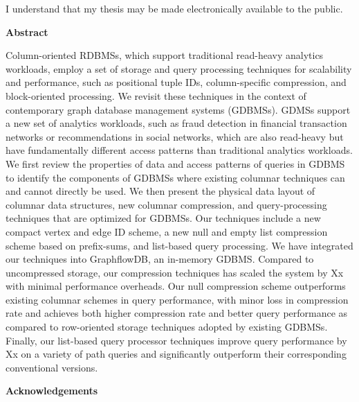 \bigskip
  
\noindent
I understand that my thesis may be made electronically available to the public.

\cleardoublepage


\begin{center}\textbf{Abstract}\end{center}

Column-oriented RDBMSs, which support traditional read-heavy analytics workloads, employ a set of storage and query processing techniques for scalability and performance, such as positional tuple IDs, column-specific compression, and block-oriented processing. We revisit these techniques in the context of contemporary graph database management systems (GDBMSs). GDMSs support a new set of analytics workloads, such as fraud detection in financial transaction networks or recommendations in social networks, which are also read-heavy but have fundamentally different access patterns than traditional analytics workloads. We first review the properties of data and access patterns of queries in GDBMS to identify the components of GDBMSs where existing columnar techniques can and cannot directly be used. We then present the physical data layout of columnar data structures, new columnar compression, and query-processing techniques that are optimized for GDBMSs. Our techniques include a new compact vertex and edge ID scheme, a new null and empty list compression scheme based on prefix-sums, and list-based query processing. We have integrated our techniques into GraphflowDB, an in-memory GDBMS. Compared to uncompressed storage, our compression techniques has scaled the system by Xx with minimal performance overheads. Our null compression scheme outperforms existing columnar schemes in query performance, with minor loss in compression rate and achieves both higher compression rate and better query performance as compared to row-oriented storage techniques adopted by existing GDBMSs. Finally, our list-based query processor techniques improve query performance by Xx on a variety of path queries and significantly outperform their corresponding conventional versions.

\cleardoublepage


\begin{center}\textbf{Acknowledgements}\end{center}

